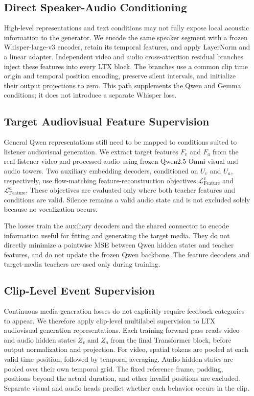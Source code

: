 \subsection{Direct Speaker-Audio Conditioning}
\label{sec:direct-audio}
High-level representations and text conditions may not fully expose local acoustic information to the generator. We encode the same speaker segment with a frozen Whisper-large-v3 encoder, retain its temporal features, and apply LayerNorm and a linear adapter. Independent video and audio cross-attention residual branches inject these features into every LTX block. The branches use a common clip time origin and temporal position encoding, preserve silent intervals, and initialize their output projections to zero. This path supplements the Qwen and Gemma conditions; it does not introduce a separate Whisper loss.

\subsection{Target Audiovisual Feature Supervision}
\label{sec:feature}
General Qwen representations still need to be mapped to conditions suited to listener audiovisual generation. We extract target features $F_v$ and $F_a$ from the real listener video and processed audio using frozen Qwen2.5-Omni visual and audio towers. Two auxiliary embedding decoders, conditioned on $U_v$ and $U_a$, respectively, use flow-matching feature-reconstruction objectives $\mathcal L_{\mathrm{Feature}}^v$ and $\mathcal L_{\mathrm{Feature}}^a$. These objectives are evaluated only where both teacher features and conditions are valid. Silence remains a valid audio state and is not excluded solely because no vocalization occurs.

The losses train the auxiliary decoders and the shared connector to encode information useful for fitting and generating the target media. They do not directly minimize a pointwise MSE between Qwen hidden states and teacher features, and do not update the frozen Qwen backbone. The feature decoders and target-media teachers are used only during training.

\subsection{Clip-Level Event Supervision}
\label{sec:event}
Continuous media-generation losses do not explicitly require feedback categories to appear. We therefore apply clip-level multilabel supervision to LTX audiovisual generation representations. Each training forward pass reads video and audio hidden states $Z_v$ and $Z_a$ from the final Transformer block, before output normalization and projection. For video, spatial tokens are pooled at each valid time position, followed by temporal averaging. Audio hidden states are pooled over their own temporal grid. The fixed reference frame, padding, positions beyond the actual duration, and other invalid positions are excluded. Separate visual and audio heads predict whether each behavior occurs in the clip.

